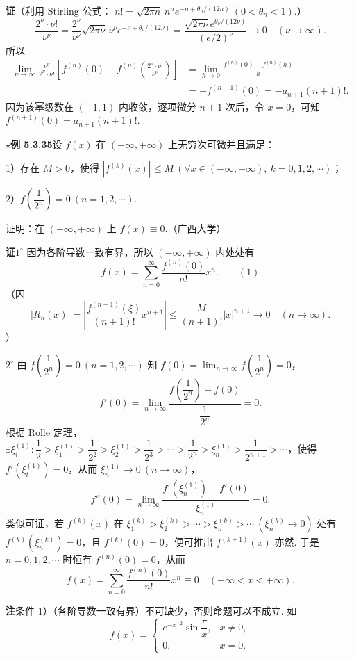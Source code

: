 \documentclass[UTF8, 12pt, fontset=fandol, oneside]{ctexart}
\begin{document}
\noindent\textbf{证}\quad （利用 Stirling 公式：
$n!=\sqrt{2\pi n}\,n^ne^{-n+\theta_n/(12n)}\ (0<\theta_n<1)$.）
\[
  \frac{2^\nu\cdot\nu!}{\nu^\nu}
  =\frac{2^\nu}{\nu^\nu}\sqrt{2\pi\nu}\,\nu^\nu e^{-\nu+\theta_\nu/(12\nu)}
  =\frac{\sqrt{2\pi\nu}e^{\theta_\nu/(12\nu)}}{\left(e/2\right)^\nu}\to0
  \quad(\nu\to\infty).
\]
所以
\[
\begin{aligned}
\lim_{\nu\to\infty}\frac{\nu^\nu}{2^\nu\cdot\nu!}
\left[f^{(n)}(0)-f^{(n)}\left(\frac{2^\nu\cdot\nu!}{\nu^\nu}\right)\right]
&=\lim_{h\to0}\frac{f^{(n)}(0)-f^{(n)}(h)}h\\
&=-f^{(n+1)}(0)=-a_{n+1}(n+1)!.
\end{aligned}
\]
因为该幂级数在 $(-1,1)$ 内收敛，逐项微分 $n+1$ 次后，令 $x=0$，可知
$f^{(n+1)}(0)=a_{n+1}(n+1)!$.

\noindent\(\star\)\textbf{例 5.3.35}\quad 设 $f(x)$ 在 $(-\infty,+\infty)$ 上无穷次可微并且满足：

1）存在 $M>0$，使得 $|f^{(k)}(x)|\le M\ (\forall x\in(-\infty,+\infty),\ k=0,1,2,\cdots)$；

2）$f\left(\dfrac1{2^n}\right)=0\ (n=1,2,\cdots)$.

证明：在 $(-\infty,+\infty)$ 上 $f(x)\equiv0$.（广西大学）

\noindent\textbf{证}\quad $1^\circ$ 因为各阶导数一致有界，所以 $(-\infty,+\infty)$ 内处处有
\[
  f(x)=\sum_{n=0}^{\infty}\frac{f^{(n)}(0)}{n!}x^n. \qquad(1)
\]
（因
\[
  |R_n(x)|=\left|\frac{f^{(n+1)}(\xi)}{(n+1)!}x^{n+1}\right|
  \le\frac{M}{(n+1)!}|x|^{n+1}\to0\quad(n\to\infty).
\]）

$2^\circ$ 由 $f\left(\dfrac1{2^n}\right)=0\ (n=1,2,\cdots)$ 知
$f(0)=\displaystyle\lim_{n\to\infty}f\left(\dfrac1{2^n}\right)=0$，
\[
  f'(0)=\lim_{n\to\infty}\frac{f\left(\dfrac1{2^n}\right)-f(0)}{\dfrac1{2^n}}=0.
\]
根据 Rolle 定理，$\exists\xi_i^{(1)}:\dfrac12>\xi_1^{(1)}>\dfrac1{2^2}>\xi_2^{(1)}>\dfrac1{2^3}>\cdots>\dfrac1{2^n}>\xi_n^{(1)}>\dfrac1{2^{n+1}}>\cdots$，使得
$f'(\xi_i^{(1)})=0$，从而 $\xi_n^{(1)}\to0\ (n\to\infty)$，
\[
  f''(0)=\lim_{n\to\infty}\frac{f'(\xi_n^{(1)})-f'(0)}{\xi_n^{(1)}}=0.
\]
类似可证，若 $f^{(k)}(x)$ 在
$\xi_1^{(k)}>\xi_2^{(k)}>\cdots>\xi_n^{(k)}>\cdots\ (\xi_n^{(k)}\to0)$ 处有
$f^{(k)}(\xi_n^{(k)})=0$，且 $f^{(k)}(0)=0$，便可推出 $f^{(k+1)}(x)$ 亦然. 于是
$n=0,1,2,\cdots$ 时恒有 $f^{(n)}(0)=0$，从而
\[
  f(x)=\sum_{n=0}^{\infty}\frac{f^{(n)}(0)}{n!}x^n\equiv0
  \quad(-\infty<x<+\infty).
\]

\noindent\textbf{注}\quad 条件 1）（各阶导数一致有界）不可缺少，否则命题可以不成立. 如
\[
  f(x)=
  \begin{cases}
    e^{-x^{-2}}\sin\dfrac\pi x,&x\ne0,\\
    0,&x=0.
  \end{cases}
\]
\end{document}
